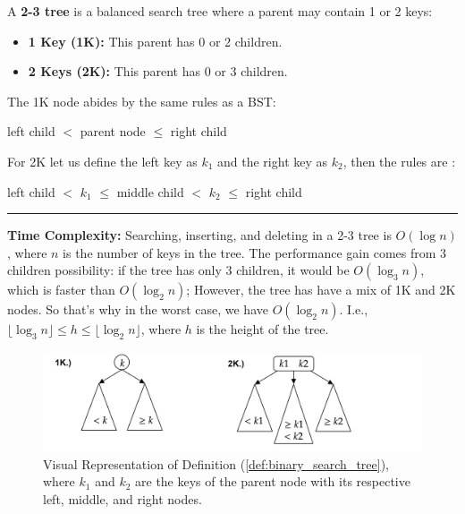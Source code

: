 \begin{Def}

    \label{def:2-3_tree}

    A \textbf{2-3 tree} is a balanced search tree where a parent may contain 1 or 2 keys:
    \begin{itemize}
        \item \textbf{1 Key (1K):} This parent has 0 or 2 children.
        \item \textbf{2 Keys (2K):} This parent has 0 or 3 children.
    \end{itemize}
    \noindent
    The 1K node abides by the same rules as a BST:
    \begin{center}
        left child $<$ parent node $\leq$ right child
    \end{center}
    \noindent
    For 2K let us define the left key as $k_1$ and the right key as $k_2$, then the rules are :
    \begin{center}
        left child $<$ $k_1$ $\leq$ middle child $<$ $k_2$ $\leq$ right child
    \end{center}
    \noindent
    \rule{\textwidth}{0.4pt}
    \textbf{Time Complexity:} Searching, inserting, and deleting in a 2-3 tree is $O(\log n)$, where $n$ is the number of keys in the tree.
    The performance gain comes from 3 children possibility: if the tree has only 3 children, it would be 
    $O(\log_3 n)$, which is faster than $O(\log_2 n)$; However, the tree has have a mix of 1K and 2K nodes.
    So that's why in the worst case, we have $O(\log_2 n)$. I.e., $\lfloor{\log_3 n}\rfloor \leq h \leq \lfloor{\log_2 n}\rfloor$, where $h$ is the height of the tree.
\end{Def}

\begin{figure}[h]
    \begin{center}
    \includegraphics[width=\textwidth]{./Sections/graphs/search/2_3.png}
    \end{center}
     \caption{Visual Representation of Definition (\ref{def:binary_search_tree}), where $k_1$ and $k_2$ are the keys of the parent node with its respective left, middle, and right nodes.}\label{fig:2-3_tree}
  \end{figure}
\newpage

